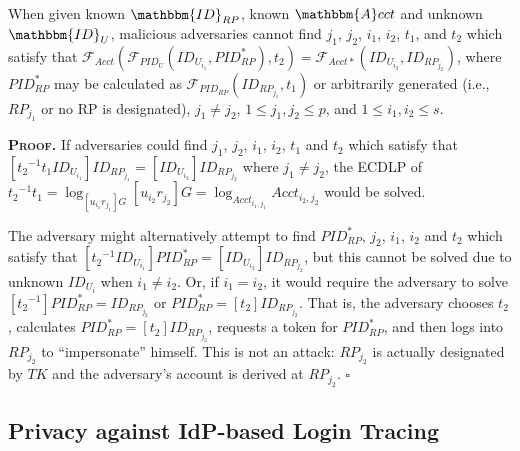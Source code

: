 
\vspace{1.5mm}
\begin{thm}[RP Designation]
When given known $\mathbbm{ID}_{RP}$, known $\mathbbm{A}cct$ and unknown $\mathbbm{ID}_U$,
 malicious adversaries cannot find ${j_1}$, ${j_2}$, ${i_1}$, ${i_2}$, $t_1$, and $t_2$ which satisfy that $\mathcal{F}_{Acct}(\mathcal{F}_{PID_U}(ID_{U_{i_1}}, PID_{RP}^{*}), t_2) = \mathcal{F}_{Acct\ast}(ID_{U_{i_2}}, ID_{RP_{j_2}})$,
where $PID_{RP}^{*}$ may be calculated as $\mathcal{F}_{PID_{RP}}(ID_{RP_{j_1}}, t_1)$
    or arbitrarily generated (i.e., $RP_{j_1}$ or no RP is designated),
    ${j_1} \neq {j_2}$, $1 \leq j_1, j_2 \leq p$, and $1 \leq i_1, i_2 \leq s$.
\label{thm-rp-designation}
\end{thm}


\noindent\textbf{\textsc{Proof.}} 
If adversaries could find ${j_1}$, ${j_2}$, ${i_1}$, ${i_2}$, $t_1$ and $t_2$ which satisfy that $[{t_2}^{-1}t_1ID_{U_{i_1}}]ID_{RP_{j_1}} = [ID_{U_{i_2}}]ID_{RP_{j_2}}$
 where ${j_1} \neq {j_2}$,
 the ECDLP of ${t_2}^{-1}t_1 = \log_{[{u_{i_1}}{r_{j_1}}]G}{[{u_{i_2}}{r_{j_2}}]G}
 = \log_{Acct_{i_1,j_1}}{Acct_{i_2,j_2}}$ would be solved.

The adversary might alternatively attempt to find $PID_{RP}^{*}$, ${j_2}$, ${i_1}$, ${i_2}$ and $t_2$ which satisfy that $[{{t_2}^{-1}}ID_{U_{i_1}}]PID_{RP}^{*} = [ID_{U_{i_2}}]ID_{RP_{j_2}}$,
        but this cannot be solved due to unknown $ID_{U_{i}}$ when ${i_1} \neq {i_2}$.
Or, if ${i_1} = {i_2}$, 
    it would require the adversary to solve $[{{t_2}^{-1}}]PID_{RP}^{*} = ID_{RP_{j_2}}$
        or $PID_{RP}^{*} = [t_2]ID_{RP_{j_2}}$.
That is,
    the adversary chooses $t_2$, calculates $PID_{RP}^{*} = [t_2]ID_{RP_{j_2}}$, requests a token for $PID_{RP}^{*}$, and then logs into $RP_{j_2}$ to ``impersonate'' himself.
This is not an attack: $RP_{j_2}$ is actually designated by $TK$ and the adversary's account is derived at $RP_{j_2}$.
\hfill $\square$

\subsection{Privacy against IdP-based Login Tracing}
\label{subsec:IdP-privacy}

